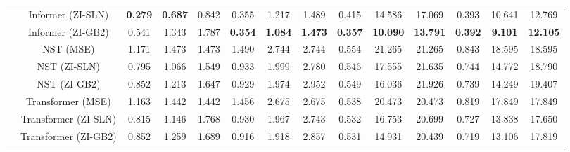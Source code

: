 \begin{table}[htbp]
{\begin{tabular}{lccccccccccccc}
 & Informer (ZI-SLN) & \textbf{0.279} & \textbf{0.687} & 0.842 & 0.355 & 1.217 & 1.489 & 0.415 & 14.586 & 17.069 & 0.393 & 10.641 & 12.769 \\
 & Informer (ZI-GB2) & 0.541 & 1.343 & 1.787 & \textbf{0.354} & \textbf{1.084} & \textbf{1.473} & \textbf{0.357} & \textbf{10.090} & \textbf{13.791} & \textbf{0.392} & \textbf{9.101} & \textbf{12.105} \\
 & NST (MSE) & 1.171 & 1.473 & 1.473 & 1.490 & 2.744 & 2.744 & 0.554 & 21.265 & 21.265 & 0.843 & 18.595 & 18.595 \\
 & NST (ZI-SLN) & 0.795 & 1.066 & 1.549 & 0.933 & 1.999 & 2.780 & 0.546 & 17.555 & 21.635 & 0.744 & 14.772 & 18.790 \\
 & NST (ZI-GB2) & 0.852 & 1.213 & 1.647 & 0.929 & 1.974 & 2.952 & 0.549 & 16.036 & 21.926 & 0.739 & 14.249 & 19.407 \\
 & Transformer (MSE) & 1.163 & 1.442 & 1.442 & 1.456 & 2.675 & 2.675 & 0.538 & 20.473 & 20.473 & 0.819 & 17.849 & 17.849 \\
 & Transformer (ZI-SLN) & 0.815 & 1.146 & 1.768 & 0.930 & 1.967 & 2.743 & 0.532 & 16.753 & 20.699 & 0.727 & 13.838 & 17.650 \\
 & Transformer (ZI-GB2) & 0.852 & 1.259 & 1.689 & 0.916 & 1.918 & 2.857 & 0.531 & 14.931 & 20.439 & 0.719 & 13.106 & 17.819 \\
\bottomrule
\end{tabular}
}
\end{table}